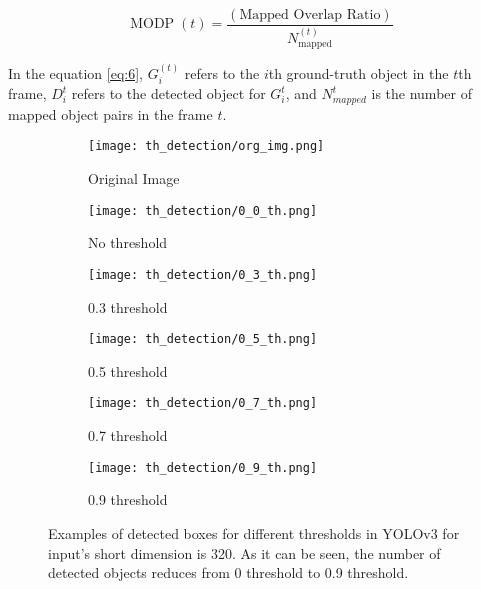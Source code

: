 \documentclass{article}
\begin{document}
\begin{itemize}
    \begin{equation} 
        \label{eq:7}
        \operatorname{MODP}(t)=\frac{(\text {Mapped Overlap Ratio})}{N_{\text {mapped}}^{(t)}}
    \end{equation}
    \indent

    In the equation \ref{eq:6}, $G_{i}^{(t)}$ refers to the $i$th ground-truth object in the 
    $t$th frame, $D_{i}^{t}$ refers to the detected object for $G_{i}^{t}$, and $N_{mapped}^{t}$ 
    is the number of mapped object pairs in the frame $t$.

\end{itemize}


\begin{figure}
    \begin{subfigure}{0.30\textwidth}%
        \centering
        \texttt{[image: th\_detection/org\_img.png]}
        \caption{Original Image}
        \label{fig:sfig1}
    \end{subfigure}     
    \begin{subfigure}{0.30\textwidth}%
        \centering
        \texttt{[image: th\_detection/0\_0\_th.png]}
        \caption{No threshold}
        \label{fig:sfig2}
    \end{subfigure}
    \begin{subfigure}{0.30\textwidth}%
        \centering
        \texttt{[image: th\_detection/0\_3\_th.png]}
        \caption{0.3 threshold}
        \label{fig:sfig3}
    \end{subfigure}


    
    \begin{subfigure}{0.30\textwidth}%
        \centering
        \texttt{[image: th\_detection/0\_5\_th.png]}
        \caption{0.5 threshold}
        \label{fig:sfig4}
    \end{subfigure}
    \begin{subfigure}{0.30\textwidth}%
        \centering
        \texttt{[image: th\_detection/0\_7\_th.png]}
        \caption{0.7 threshold}
        \label{fig:sfig5}
    \end{subfigure}
    \begin{subfigure}{0.30\textwidth}%
        \centering
        \texttt{[image: th\_detection/0\_9\_th.png]}
        \caption{0.9 threshold}
        \label{fig:sfig6}
    \end{subfigure}
    \caption{Examples of detected boxes for different thresholds in YOLOv3 
    for input's short dimension is 320. As it can be seen, the number of detected objects reduces 
    from 0 threshold to 0.9 threshold.}
    \label{fig:exp_imgs}
\end{figure}
\end{document}
